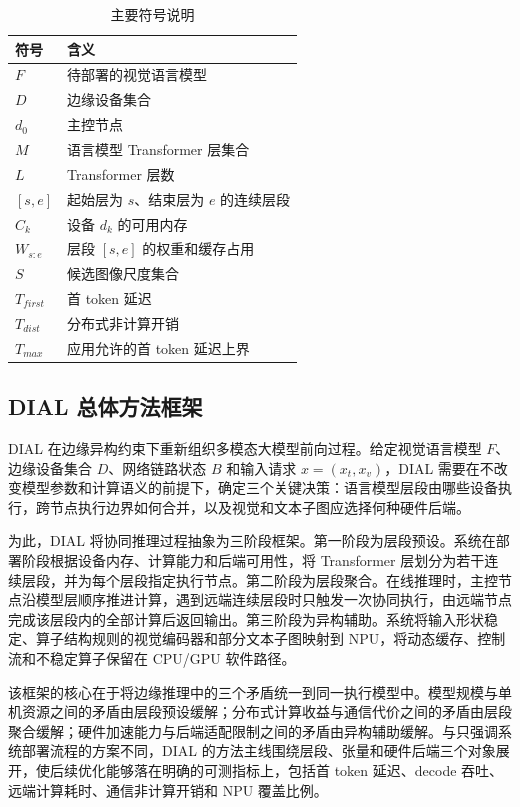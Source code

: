 \documentclass[10pt,a4paper,twocolumn]{ctexart}
\begin{document}
\begin{table}[t]
\centering
\caption{主要符号说明}
\small
\begin{tabular}{ll}
\toprule
符号 & 含义 \\
\midrule
\(F\) & 待部署的视觉语言模型 \\
\(D\) & 边缘设备集合 \\
\(d_0\) & 主控节点 \\
\(M\) & 语言模型 Transformer 层集合 \\
\(L\) & Transformer 层数 \\
\([s,e]\) & 起始层为 \(s\)、结束层为 \(e\) 的连续层段 \\
\(C_k\) & 设备 \(d_k\) 的可用内存 \\
\(W_{s:e}\) & 层段 \([s,e]\) 的权重和缓存占用 \\
\(S\) & 候选图像尺度集合 \\
\(T_{first}\) & 首 token 延迟 \\
\(T_{dist}\) & 分布式非计算开销 \\
\(T_{max}\) & 应用允许的首 token 延迟上界 \\
\bottomrule
\end{tabular}
\end{table}

\subsection{DIAL 总体方法框架}

DIAL 在边缘异构约束下重新组织多模态大模型前向过程。给定视觉语言模型 \(F\)、边缘设备集合 \(D\)、网络链路状态 \(B\) 和输入请求 \(x=(x_t,x_v)\)，DIAL 需要在不改变模型参数和计算语义的前提下，确定三个关键决策：语言模型层段由哪些设备执行，跨节点执行边界如何合并，以及视觉和文本子图应选择何种硬件后端。

为此，DIAL 将协同推理过程抽象为三阶段框架。第一阶段为层段预设。系统在部署阶段根据设备内存、计算能力和后端可用性，将 Transformer 层划分为若干连续层段，并为每个层段指定执行节点。第二阶段为层段聚合。在线推理时，主控节点沿模型层顺序推进计算，遇到远端连续层段时只触发一次协同执行，由远端节点完成该层段内的全部计算后返回输出。第三阶段为异构辅助。系统将输入形状稳定、算子结构规则的视觉编码器和部分文本子图映射到 NPU，将动态缓存、控制流和不稳定算子保留在 CPU/GPU 软件路径。

该框架的核心在于将边缘推理中的三个矛盾统一到同一执行模型中。模型规模与单机资源之间的矛盾由层段预设缓解；分布式计算收益与通信代价之间的矛盾由层段聚合缓解；硬件加速能力与后端适配限制之间的矛盾由异构辅助缓解。与只强调系统部署流程的方案不同，DIAL 的方法主线围绕层段、张量和硬件后端三个对象展开，使后续优化能够落在明确的可测指标上，包括首 token 延迟、decode 吞吐、远端计算耗时、通信非计算开销和 NPU 覆盖比例。
\end{document}
